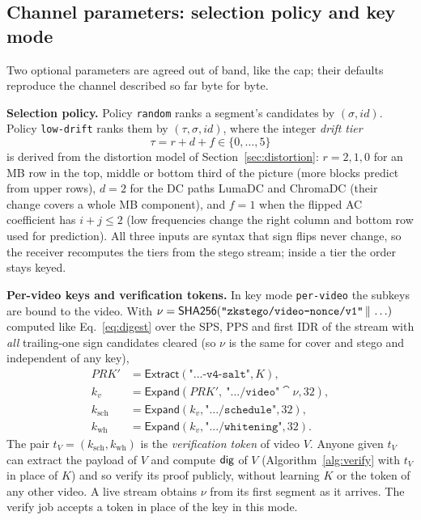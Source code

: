 \subsection{Channel parameters: selection policy and key mode}
\label{sec:params}
Two optional parameters are agreed out of band, like the cap; their defaults reproduce the channel described so far byte for byte.

\textbf{Selection policy.} Policy \texttt{random} ranks a segment's candidates by $(\sigma,\mathit{id})$. Policy \texttt{low-drift} ranks them by $(\tau,\sigma,\mathit{id})$, where the integer \emph{drift tier}
\begin{equation}
\tau=r+d+f\in\{0,\dots,5\}
\label{eq:tier}
\end{equation}
is derived from the distortion model of Section~\ref{sec:distortion}: $r=2,1,0$ for an MB row in the top, middle or bottom third of the picture (more blocks predict from upper rows), $d=2$ for the DC paths LumaDC and ChromaDC (their change covers a whole MB component), and $f=1$ when the flipped AC coefficient has $i+j\le2$ (low frequencies change the right column and bottom row used for prediction). All three inputs are syntax that sign flips never change, so the receiver recomputes the tiers from the stego stream; inside a tier the order stays keyed.

\textbf{Per-video keys and verification tokens.} In key mode \texttt{per-video} the subkeys are bound to the video. With $\nu=\mathsf{SHA256}(\texttt{"zkstego/video-nonce/v1"}\,\|\,\ldots)$ computed like Eq.~\eqref{eq:digest} over the SPS, PPS and first IDR of the stream with \emph{all} trailing-one sign candidates cleared (so $\nu$ is the same for cover and stego and independent of any key),
\begin{align}
\mathit{PRK}'&=\mathsf{Extract}(\texttt{"...-v4-salt"},K),\nonumber\\
k_v&=\mathsf{Expand}(\mathit{PRK}',\ \texttt{".../video"}\cat\nu,32),\nonumber\\
k_{\mathrm{sch}}&=\mathsf{Expand}(k_v,\texttt{".../schedule"},32),\nonumber\\
k_{\mathrm{wh}}&=\mathsf{Expand}(k_v,\texttt{".../whitening"},32).
\end{align}
The pair $t_V=(k_{\mathrm{sch}},k_{\mathrm{wh}})$ is the \emph{verification token} of video $V$. Anyone given $t_V$ can extract the payload of $V$ and compute $\mathsf{dig}$ of $V$ (Algorithm~\ref{alg:verify} with $t_V$ in place of $K$) and so verify its proof publicly, without learning $K$ or the token of any other video. A live stream obtains $\nu$ from its first segment as it arrives. The verify job accepts a token in place of the key in this mode.


